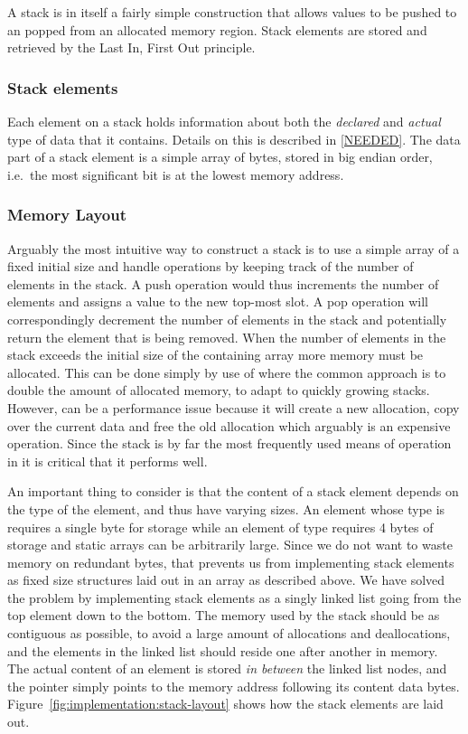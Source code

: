 A stack is in itself a fairly simple construction that allows values to be
pushed to an popped from an allocated memory region. Stack elements are stored
and retrieved by the Last In, First Out principle.

\subsubsection{Stack elements}

Each element on a stack holds information about both the \textit{declared} and
\textit{actual} type of data that it contains. Details on this is described in
\ref{NEEDED}. The data part of a stack element is a simple array of bytes,
stored in big endian order, i.e.~the most significant bit is at the lowest
memory address.

\subsubsection{Memory Layout}

Arguably the most intuitive way to construct a stack is to use a simple array of
a fixed initial size and handle operations by keeping track of the number of
elements in the stack. A push operation would thus increments the number of
elements and assigns a value to the new top-most slot. A pop operation will
correspondingly decrement the number of elements in the stack and potentially
return the element that is being removed. When the number of elements in the
stack exceeds the initial size of the containing array more memory must be
allocated. This can be done simply by use of  where the common
approach is to double the amount of allocated memory, to adapt to quickly
growing stacks. However,  can be a performance issue because it
will create a new allocation, copy over the current data and free the old
allocation\cite{man-realloc} which arguably is an expensive operation. Since the
stack is by far the most frequently used means of operation in \thename{} it is
critical that it performs well.

An important thing to consider is that the content of a stack element depends on
the type of the element, and thus have varying sizes. An element whose type is
 requires a single byte for storage while an element of type
 requires 4 bytes of storage and static arrays can be arbitrarily
large. Since we do not want to waste memory on redundant bytes, that prevents us
from implementing stack elements as fixed size structures laid out in an array
as described above. We have solved the problem by implementing stack elements as
a singly linked list going from the top element down to the bottom. The memory
used by the stack should be as contiguous as possible, to avoid a large amount
of allocations and deallocations, and the elements in the linked list should
reside one after another in memory. The actual content of an element is stored
\textit{in between} the linked list nodes, and the  pointer simply
points to the memory address following its content data
bytes. Figure~\ref{fig:implementation:stack-layout} shows how the stack elements
are laid out.

